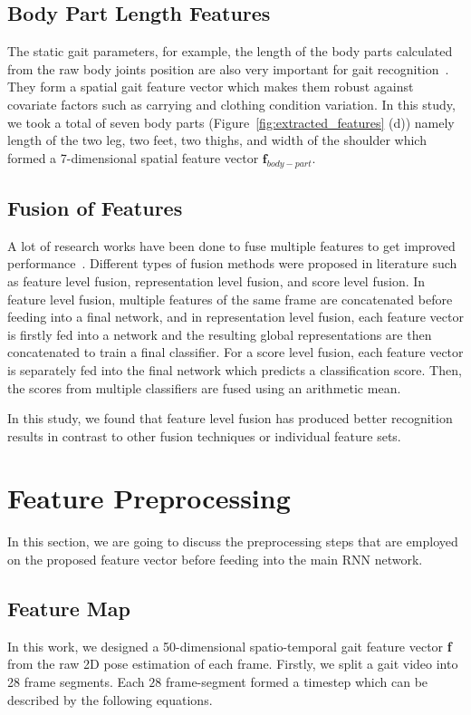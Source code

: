 \subsection{Body Part Length Features}
The static gait parameters, for example, the length of the body parts calculated from the raw body joints position are also very important for gait recognition~\cite{Wang_04, Araujo_13}. They form a spatial gait feature vector which makes them robust against covariate factors such as carrying and clothing condition variation. In this study, we took a total of seven body parts (Figure~\ref{fig:extracted_features} (d)) namely length of the two leg, two feet, two thighs, and width of the shoulder which formed a 7-dimensional spatial feature vector $\textbf{f}_{body-part}$. 


\subsection{Fusion of Features}
A lot of research works have been done to fuse multiple features to get improved performance~\cite{Liao_19, Wang_04}.  Different types of fusion methods were proposed in literature such as feature level fusion, representation level fusion, and score level fusion. In feature level fusion, multiple features of the same frame are concatenated before feeding into a final network, and in representation level fusion, each feature vector is firstly fed into a network and the resulting global representations are then concatenated to train a final classifier. For a score level fusion, each feature vector is separately fed into the final network which predicts a classification score. Then, the scores from multiple classifiers are fused using an arithmetic mean.

In this study, we found that feature level fusion has produced better recognition results in contrast to other fusion techniques or individual feature sets. 




\section{Feature Preprocessing} \label{sec:feature_preprocess}
In this section, we are going to discuss the preprocessing steps that are employed on the proposed feature vector before feeding into the main RNN network.

\subsection{Feature Map}
In this work, we designed a 50-dimensional spatio-temporal gait feature vector \textbf{f} from the raw 2D pose estimation of each frame.  Firstly, we split a gait video into 28 frame segments. Each $28$ frame-segment formed a timestep which can be described by the following equations. 

